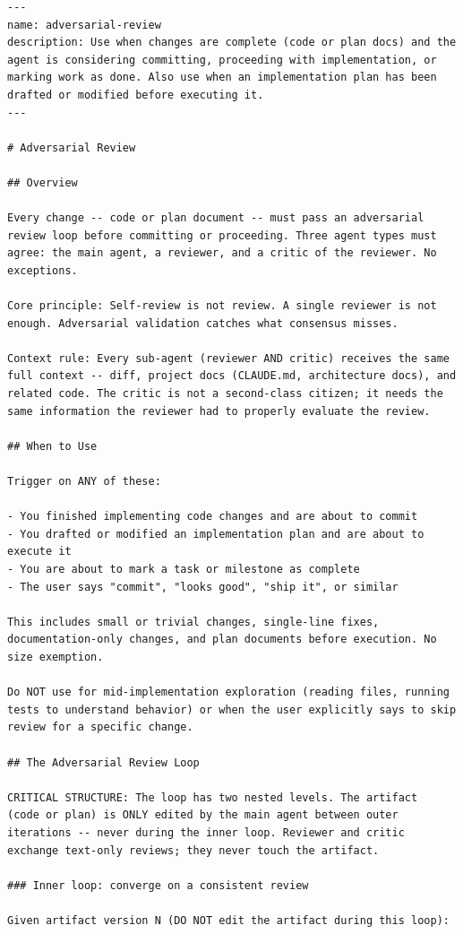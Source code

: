 \documentclass{article}
\begin{document}
\begin{footnotesize}
\begin{verbatim}
---
name: adversarial-review
description: Use when changes are complete (code or plan docs) and the
agent is considering committing, proceeding with implementation, or
marking work as done. Also use when an implementation plan has been
drafted or modified before executing it.
---

# Adversarial Review

## Overview

Every change -- code or plan document -- must pass an adversarial
review loop before committing or proceeding. Three agent types must
agree: the main agent, a reviewer, and a critic of the reviewer. No
exceptions.

Core principle: Self-review is not review. A single reviewer is not
enough. Adversarial validation catches what consensus misses.

Context rule: Every sub-agent (reviewer AND critic) receives the same
full context -- diff, project docs (CLAUDE.md, architecture docs), and
related code. The critic is not a second-class citizen; it needs the
same information the reviewer had to properly evaluate the review.

## When to Use

Trigger on ANY of these:

- You finished implementing code changes and are about to commit
- You drafted or modified an implementation plan and are about to execute it
- You are about to mark a task or milestone as complete
- The user says "commit", "looks good", "ship it", or similar

This includes small or trivial changes, single-line fixes,
documentation-only changes, and plan documents before execution. No
size exemption.

Do NOT use for mid-implementation exploration (reading files, running
tests to understand behavior) or when the user explicitly says to skip
review for a specific change.

## The Adversarial Review Loop

CRITICAL STRUCTURE: The loop has two nested levels. The artifact
(code or plan) is ONLY edited by the main agent between outer
iterations -- never during the inner loop. Reviewer and critic
exchange text-only reviews; they never touch the artifact.

### Inner loop: converge on a consistent review

Given artifact version N (DO NOT edit the artifact during this loop):


\end{verbatim}
\end{footnotesize}
\end{document}
